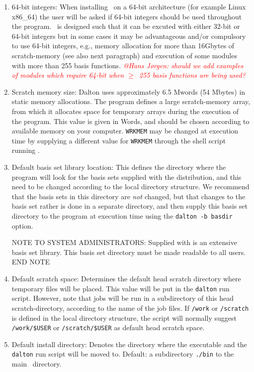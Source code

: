 \begin{enumerate}
\item 64-bit integers:
When installing \dalton\ on a 64-bit architecture (for example Linux x86\_64) 
the user will be asked if 64-bit integers should be used throughout the program. 
\dalton\ is designed such that it can be excuted with either 32-bit or 64-bit 
integers but in some cases it may be advantageous and/or compulsory 
to use 64-bit integers, e.g., memory allocation for more than 16Gbytes  
of scratch-memory (see also next paragraph) and execution of some modules 
with more than 255 basis functions. {\textcolor{red}{\em @Hans J{\o}rgen: 
should we add examples of modules which require 64-bit when 
$\geq$\ 255 basis functions are being used?}}

\item Scratch memory
size: Dalton uses approximately 6.5 Mwords (54 Mbytes)
in static memory allocations. The program defines a large scratch-memory
array, from which it allocates space for temporary arrays
during the execution of the program. This value is given in Words, and
should be chosen according to available memory on your computer.
\verb|WRKMEM| may be changed at execution time by supplying a
different value for \verb|WRKMEM| through the shell script running
{\dalton}.

\item Default basis set library
location: This defines the directory where the program will look for the
basis sets supplied with the distribution, and this need to be
changed according to the local directory structure. We recommend
that the basis sets in this directory are {\em not} changed, but
that changes to the basis set rather is done in a separate
directory, and then supply this basis set directory to the program
at execution time using the \verb|dalton -b basdir| option.

{\sc NOTE TO SYSTEM ADMINISTRATORS:} Supplied with {\dalton} is an
extensive basis set library. This basis set directory must be made
readable to all users. {\sc END NOTE}

\item Default scratch
space:
Determines the default head scratch
directory where temporary files will be placed. This value will be put
in the \verb|dalton| run script. However, note that jobs will be run in
a subdirectory of this head scratch-directory, according to the name
of the job files. If \verb|/work| or \verb|/scratch| is defined in the
local directory structure, the script will normally suggest
\verb|/work/$USER| or  \verb|/scratch/$USER| as default head scratch space.

\item Default install 
directory:
Denotes the directory where the {\dalton} executable and the
\verb|dalton| run script will be moved to.
Default: a subdirectory {\tt ./bin} to the main \dalton\ directory.
\end{enumerate}

